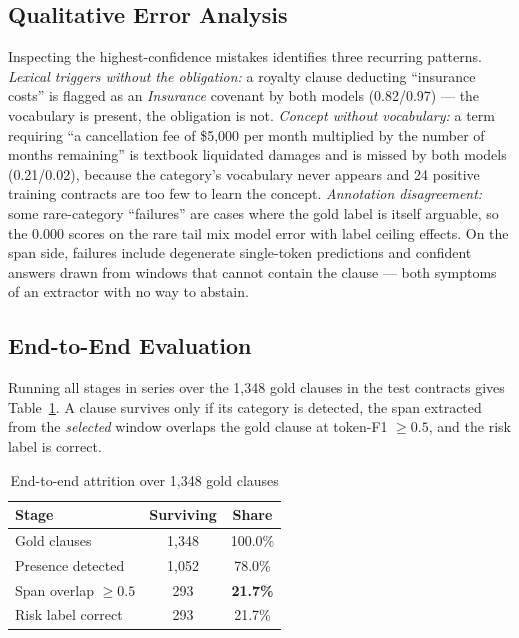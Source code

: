 \documentclass[journal,a4paper]{IEEEtran}
\begin{document}
\subsection{Qualitative Error Analysis}
Inspecting the highest-confidence mistakes identifies three recurring patterns. \emph{Lexical
triggers without the obligation:} a royalty clause deducting ``insurance costs'' is flagged as an
\emph{Insurance} covenant by both models (0.82/0.97) --- the vocabulary is present, the obligation
is not. \emph{Concept without vocabulary:} a term requiring ``a cancellation fee of \$5{,}000 per
month multiplied by the number of months remaining'' is textbook liquidated damages and is missed by
both models (0.21/0.02), because the category's vocabulary never appears and 24 positive training
contracts are too few to learn the concept. \emph{Annotation disagreement:} some rare-category
``failures'' are cases where the gold label is itself arguable, so the 0.000 scores on the rare tail
mix model error with label ceiling effects. On the span side, failures include degenerate
single-token predictions and confident answers drawn from windows that cannot contain the clause ---
both symptoms of an extractor with no way to abstain.

\subsection{End-to-End Evaluation}
\label{sec:e2e}
Running all stages in series over the 1{,}348 gold clauses in the test contracts gives
Table~\ref{tab:e2e}. A clause survives only if its category is detected, the span extracted
from the \emph{selected} window overlaps the gold clause at token-F1 $\geq 0.5$, and the risk
label is correct.

\begin{table}[!t]
\caption{End-to-end attrition over 1{,}348 gold clauses}
\label{tab:e2e}
\centering
\begin{tabular}{lcc}
\toprule
\textbf{Stage} & \textbf{Surviving} & \textbf{Share}\\
\midrule
Gold clauses            & 1{,}348 & 100.0\%\\
Presence detected       & 1{,}052 & 78.0\%\\
Span overlap $\geq 0.5$ & 293     & \textbf{21.7\%}\\
Risk label correct      & 293     & 21.7\%\\
\bottomrule
\end{tabular}
\end{table}
\end{document}
